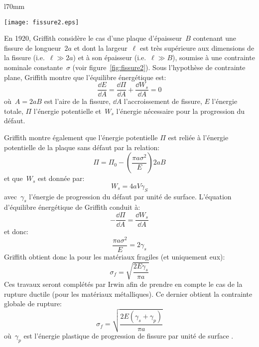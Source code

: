 \medskip
\begin{wrapfigure}{l}{70mm}
\begin{center}
\texttt{[image: fissure2.eps]}
\end{center}
\caption{Concentration de contraintes autour d'une fissure: plaque mince}\label{fig:fissure2}
\end{wrapfigure}
En 1920, Griffith considère le cas d'une plaque d'épaisseur~$B$ contenant une fissure de longueur~$2a$ et dont la largeur~$\ell$ est très supérieure aux dimensions de la fissure (i.e.~$\ell\gg 2a$) et à son épaisseur (i.e.~$\ell\gg B$), soumise à une contrainte nominale constante~$\sigma$ (voir figure~\ref{fig:fissure2}).
\medskipvm
Sous l'hypothèse de contrainte plane, Griffith montre que l'équilibre énergétique est:
\begin{equation} \frac{\dd E}{\dd A} = \dfrac{\dd\Pi}{\dd A}+\frac{\dd W_s}{\dd A} = 0 \end{equation}
où~$A=2aB$ est l'aire de la fissure, $\dd A$ l'accroissement de fissure, $E$ l'énergie totale, $\Pi$ l'énergie potentielle et~$W_s$ l'énergie nécessaire pour la progression du défaut.

\medskip
Griffith montre également que l'énergie potentielle $\Pi$ est reliée à l'énergie potentielle de la plaque sans défaut par la relation:
\begin{equation} \Pi=\Pi_0 -\left( \dfrac{\pi a \sigma^2}{E} \right) 2aB \end{equation}
et que~$W_s$ est donnée par:
\begin{equation} W_s=4aV\gamma_S\end{equation}
avec~$\gamma_s$ l'énergie de progression du défaut par unité de surface.
L'équation d'équilibre énergétique de Griffith conduit à:
\begin{equation}-\frac{\dd\Pi}{\dd A}=\frac{\dd W_s}{\dd A}\end{equation} et donc:
\begin{equation}\frac{\pi a\sigma^2}{E}=2\gamma_s\end{equation}
\medskipvm
Griffith obtient donc la  pour les matériaux fragiles (et uniquement eux):
\begin{equation} \sigma_f = \sqrt{\dfrac{2E\gamma_s}{\pi a}} \end{equation}
Ces travaux seront complétés par Irwin afin de prendre en compte le cas de la rupture ductile (pour les matériaux métalliques). Ce dernier obtient la contrainte globale de rupture:
\begin{equation} \sigma_f = \sqrt{\dfrac{2E(\gamma_s+\gamma_p)}{\pi a}} \end{equation}
où~$\gamma_p$ est l'énergie plastique de progression de fissure par unité de surface
.


